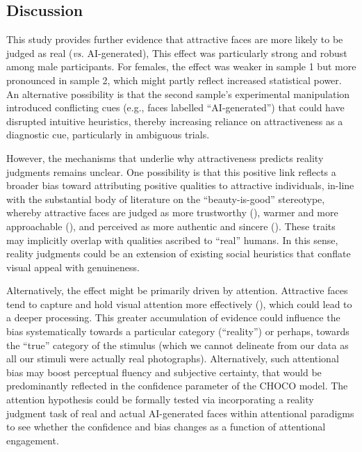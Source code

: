 \documentclass[
  jou,
  floatsintext,
  longtable,
  nolmodern,
  notxfonts,
  notimes,
  colorlinks=true,linkcolor=blue,citecolor=blue,urlcolor=blue]{apa7}
\begin{document}
\subsection{Discussion}\label{discussion-1}

This study provides further evidence that attractive faces are more
likely to be judged as real (\emph{vs.} AI-generated), This effect was
particularly strong and robust among male participants. For females, the
effect was weaker in sample 1 but more pronounced in sample 2, which
might partly reflect increased statistical power. An alternative
possibility is that the second sample's experimental manipulation
introduced conflicting cues (e.g., faces labelled ``AI-generated'') that
could have disrupted intuitive heuristics, thereby increasing reliance
on attractiveness as a diagnostic cue, particularly in ambiguous trials.

However, the mechanisms that underlie why attractiveness predicts
reality judgments remains unclear. One possibility is that this positive
link reflects a broader bias toward attributing positive qualities to
attractive individuals, in-line with the substantial body of literature
on the ``beauty-is-good'' stereotype, whereby attractive faces are
judged as more trustworthy (), warmer and more approachable
(), and perceived as
more authentic and sincere (). These traits may implicitly overlap with qualities ascribed to
``real'' humans. In this sense, reality judgments could be an extension
of existing social heuristics that conflate visual appeal with
genuineness.

Alternatively, the effect might be primarily driven by attention.
Attractive faces tend to capture and hold visual attention more
effectively (), which could lead to a deeper processing. This greater
accumulation of evidence could influence the bias systematically towards
a particular category (``reality'') or perhaps, towards the ``true''
category of the stimulus (which we cannot delineate from our data as all
our stimuli were actually real photographs). Alternatively, such
attentional bias may boost perceptual fluency and subjective certainty,
that would be predominantly reflected in the confidence parameter of the
CHOCO model. The attention hypothesis could be formally tested via
incorporating a reality judgment task of real and actual AI-generated
faces within attentional paradigms to see whether the confidence and
bias changes as a function of attentional engagement.
\end{document}
